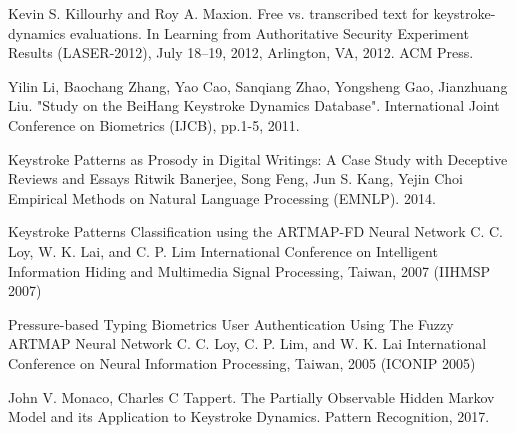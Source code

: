 \documentclass[9pt,shortpaper,twoside,web]{ieeecolor}
\begin{document}
\begin{thebibliography}{00}
 Kevin S. Killourhy and Roy A. Maxion. Free vs. transcribed text for keystroke-dynamics evaluations. In Learning from Authoritative Security Experiment Results (LASER-2012), July 18–19, 2012, Arlington, VA, 2012. ACM Press.

 Yilin Li, Baochang Zhang, Yao Cao, Sanqiang Zhao, Yongsheng Gao, Jianzhuang Liu. "Study on the BeiHang Keystroke Dynamics Database". International Joint Conference on Biometrics (IJCB), pp.1-5, 2011.

 Keystroke Patterns as Prosody in Digital Writings: A Case Study with Deceptive Reviews and Essays Ritwik Banerjee, Song Feng, Jun S. Kang, Yejin Choi Empirical Methods on Natural Language Processing (EMNLP). 2014.

 Keystroke Patterns Classification using the ARTMAP-FD Neural Network C. C. Loy, W. K. Lai, and C. P. Lim International Conference on Intelligent Information Hiding and Multimedia Signal Processing, Taiwan, 2007 (IIHMSP 2007) 

Pressure-based Typing Biometrics User Authentication Using The Fuzzy ARTMAP Neural Network C. C. Loy, C. P. Lim, and W. K. Lai International Conference on Neural Information Processing, Taiwan, 2005 (ICONIP 2005) 

 John V. Monaco, Charles C Tappert. The Partially Observable Hidden Markov Model and its Application to Keystroke Dynamics. Pattern Recognition, 2017.
\end{thebibliography}
\end{document}
